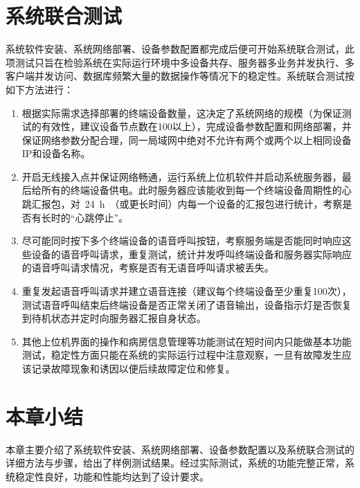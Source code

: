 \section{系统联合测试}
系统软件安装、系统网络部署、设备参数配置都完成后便可开始系统联合测试，此项测试只旨在检验系统在实际运行环境中多设备共存、服务器多业务并发执行、多客户端并发访问、数据库频繁大量的数据操作等情况下的稳定性。系统联合测试按如下方法进行：\clearpage
{}
\begin{enumerate}
\item 根据实际需求选择部署的终端设备数量，这决定了系统网络的规模（为保证测试的有效性，建议设备节点数在100以上），完成设备参数配置和网络部署，并保证网络参数分配合理，同一局域网中绝对不允许有两个或两个以上相同设备IP和设备名称。
\item 开启无线接入点并保证网络畅通，运行系统上位机软件并启动系统服务器，最后给所有的终端设备供电。此时服务器应该能收到每一个终端设备周期性的心跳汇报包，对~24~h~（或更长时间）内每一个设备的汇报包进行统计，考察是否有长时的“心跳停止”。
\item 尽可能同时按下多个终端设备的语音呼叫按钮，考察服务端是否能同时响应这些设备的语音呼叫请求，重复测试，统计并发呼叫终端设备和服务器实际响应的语音呼叫请求情况，考察是否有无语音呼叫请求被丢失。
\item 重复发起语音呼叫请求并建立语音连接（建议每个终端设备至少重复100次），测试语音呼叫结束后终端设备是否正常关闭了语音输出，设备指示灯是否恢复到待机状态并定时向服务器汇报自身状态。
\item 其他上位机界面的操作和病房信息管理等功能测试在短时间内只能做基本功能测试，稳定性方面只能在系统的实际运行过程中注意观察，一旦有故障发生应该记录故障现象和诱因以便后续故障定位和修复。
\end{enumerate}

\section{本章小结}
本章主要介绍了系统软件安装、系统网络部署、设备参数配置以及系统联合测试的详细方法与步骤，给出了样例测试结果。经过实际测试，系统的功能完整正常，系统稳定性良好，功能和性能均达到了设计要求。